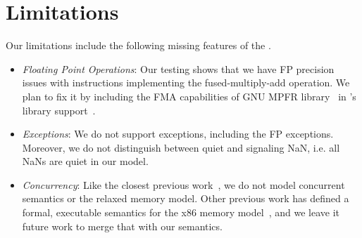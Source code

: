 \section{Limitations}\label{sec:limit}
Our limitations include the following missing features of the \ISA.
%
\begin{itemize}
 \item {\em Floating Point Operations\/}: Our testing shows that we have FP precision issues with instructions implementing the fused-multiply-add operation. We plan to fix it by including the FMA capabilities of GNU MPFR library~\cite{GNUMPFR} in \K's library support~\cite{MPFRJAVA}.
 \item {\em Exceptions\/}: We do not support exceptions, including the FP exceptions. Moreover, we do not distinguish between quiet and signaling NaN, i.e. all NaNs are quiet in our model.
 \item {\em Concurrency\/}: Like the closest previous work~\cite{Goel:FMCAD14,Heule2016a}, we do not model concurrent semantics or the relaxed memory model. Other previous work has defined a formal, executable semantics for the x86 memory model~\cite{Sarkar:POPL09,Owens:x86-TSO}, and we leave it future work to merge that with our semantics.   
\end{itemize}
